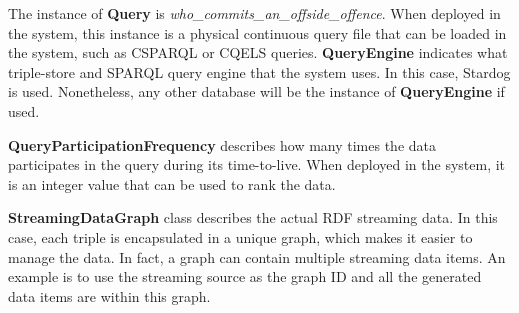The instance of \textbf{Query} is \textit{who\_commits\_an\_offside\_offence}. 
When deployed in the system, this instance is a physical continuous query file that can be loaded in the system, such as CSPARQL or CQELS queries. 
\textbf{QueryEngine} indicates what triple-store and SPARQL query engine that the system uses. 
In this case, Stardog is used. 
Nonetheless, any other database will be the instance of \textbf{QueryEngine} if used. 

\textbf{QueryParticipationFrequency} describes how many times the data participates in the query during its time-to-live.
When deployed in the system, it is an integer value that can be used to rank the data. 

\textbf{StreamingDataGraph} class describes the actual RDF streaming data.
In this case, each triple is encapsulated in a unique graph, which makes it easier to manage the data.
In fact, a graph can contain multiple streaming data items. 
An example is to use the streaming source as the graph ID and all the generated data items are within this graph. 

